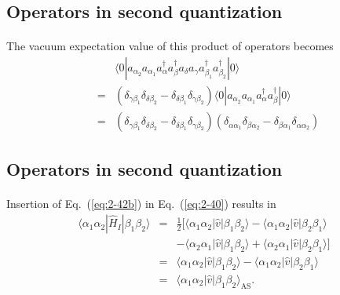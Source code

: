 \documentclass[%
twoside,                 %
final,                   %
10pt]{article}
\begin{document}
\subsection*{Operators in second quantization}

\paragraph{}
The vacuum expectation value of this product of operators becomes
\begin{eqnarray}
	&& \langle 0|a_{\alpha_2} a_{\alpha_1} a^{\dagger}_\alpha a^{\dagger}_\beta a_\delta a_\gamma 
		a_{\beta_1}^{\dagger} a_{\beta_2}^{\dagger}|0\rangle \nonumber \\
	&=& (\delta_{\gamma \beta_1} \delta_{\delta \beta_2} -
		\delta_{\delta \beta_1} \delta_{\gamma \beta_2} ) 
		\langle 0|a_{\alpha_2} a_{\alpha_1}a^{\dagger}_\alpha a^{\dagger}_\beta|0\rangle \nonumber \\
	&=& (\delta_{\gamma \beta_1} \delta_{\delta \beta_2} -\delta_{\delta \beta_1} \delta_{\gamma \beta_2} )
	(\delta_{\alpha \alpha_1} \delta_{\beta \alpha_2} -\delta_{\beta \alpha_1} \delta_{\alpha \alpha_2} ) \label{eq:2-42b}
\end{eqnarray}





\subsection*{Operators in second quantization}

\paragraph{}
Insertion of 
Eq.~(\ref{eq:2-42b}) in Eq.~(\ref{eq:2-40}) results in
\begin{eqnarray}
	\langle \alpha_1\alpha_2|\hat{H}_I|\beta_1\beta_2\rangle &=& \frac{1}{2} \big[ 
		\langle \alpha_1\alpha_2|\hat{v}|\beta_1\beta_2\rangle- \langle \alpha_1\alpha_2|\hat{v}|\beta_2\beta_1\rangle \nonumber \\
		&& - \langle \alpha_2\alpha_1|\hat{v}|\beta_1\beta_2\rangle + \langle \alpha_2\alpha_1|\hat{v}|\beta_2\beta_1\rangle \big] \nonumber \\
	&=& \langle \alpha_1\alpha_2|\hat{v}|\beta_1\beta_2\rangle - \langle \alpha_1\alpha_2|\hat{v}|\beta_2\beta_1\rangle \nonumber \\
	&=& \langle \alpha_1\alpha_2|\hat{v}|\beta_1\beta_2\rangle_{\mathrm{AS}}. \label{eq:2-43b}
\end{eqnarray}
\end{document}
